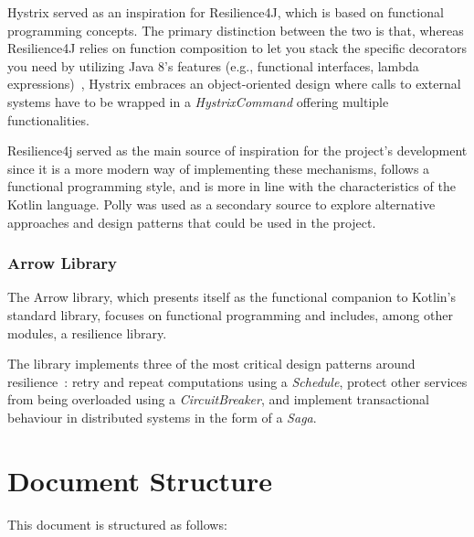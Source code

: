 Hystrix served as an inspiration for Resilience4J, which is based on functional programming concepts.
The primary distinction between the two is that, whereas Resilience4J relies on function composition to let you stack the specific decorators you need by utilizing Java 8's features (e.g., functional interfaces, lambda expressions)~\cite{resilience4j-vs-hystrix}, Hystrix embraces an object-oriented design where calls to external systems have to be wrapped in a \textit{HystrixCommand} offering multiple functionalities.

Resilience4j served as the main source of inspiration for the project's development since it is a more modern way of implementing these mechanisms, follows a functional programming style, and is more in line with the characteristics of the Kotlin language.
Polly was used as a secondary source to explore alternative approaches and design patterns that could be used in the project.

\subsubsection{Arrow Library}

The Arrow library, which presents itself as the functional companion to Kotlin's standard library, focuses on functional programming and includes, among other modules, a resilience library.

The library implements three of the most critical design patterns around resilience~\cite{arrow-resilience}: retry and repeat computations using a \textit{Schedule}, protect other services from being overloaded using a \textit{CircuitBreaker}, and implement transactional behaviour in distributed systems in the form of a \textit{Saga}.


\section{Document Structure}\label{sec:document-structure}

This document is structured as follows:

